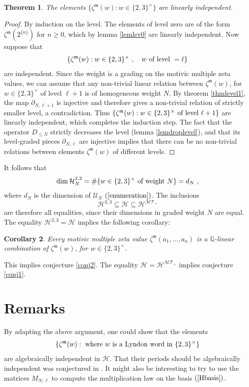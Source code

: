 \documentclass[10pt]{amsart}
\newtheorem{thm}{Theorem}[section]
\newtheorem{cor}[thm]{Corollary}
\theoremstyle{definition}
\theoremstyle{remark}
\numberwithin{equation}{section}
\newcommand{\Ho}{\mathcal{H}}
\newcommand{\Homt}{\mathcal{H^{MT_+}}}
\newcommand{\zetam}{\zeta^{ \mathfrak{m}}}
\newcommand{\Q}{\mathbb Q}
\newcommand{\U}{\mathcal{U}}
\begin{document}
\begin{thm}  The elements
$\{\zetam(w): w\in \{2,3\}^{\times}\}$
are linearly independent.
\end{thm} 
\begin{proof}  By induction on the level. The elements of level zero are of the form 
$\zetam(2^{\{n\}})$ for $n\geq 0$, which by lemma \ref{lemlev0} are linearly independent. Now suppose that 
$$\{\zetam(w): w\in \{2,3\}^\times \ , \quad w \hbox{ of level } = \ell\}$$
are independent. Since the  weight is a grading on the motivic multiple zeta values,  we can assume that any non-trivial linear relation between $\zetam(w)$, for $w\in \{2,3\}^\times$ of level $\ell+1$ is of  homogeneous weight $N$.  By theorem \ref{thmlevel1}, the map $\partial_{N,\ell+1}$ is injective and therefore  gives  a non-trivial  relation  of  strictly smaller  level, a contradiction. Thus $\{\zetam(w): w\in \{2,3\}^\times \hbox{ of level }\ell+1\}$ are linearly independent, which completes the induction step.   The fact that
the operator $D_{\leq N}$  strictly decreases the level 
 (lemma \ref{lemdroplevel}), and that its level-graded pieces    $\partial_{N,\ell}$ are injective   implies  that there can be no non-trivial relations between elements $\zetam(w)$ of different levels.
\end{proof}
It follows that 
\begin{equation} \label{lowerbound} \dim \Ho_N^{2,3}  =  \#\{w\in \{2,3\}^\times  \hbox{ of weight } N\} =  d_N\ ,
\end{equation}
where $d_N$ is the dimension of $\U_N$ $(\ref{enumeration})$. The inclusions
$$\Ho^{2,3}\subseteq \Ho \subseteq \Homt$$
are therefore all equalities, since their dimensions in graded weight $N$ are  equal.
The equality $\Ho^{2,3}=\Ho$ implies the following corollary:
\begin{cor} Every motivic multiple zeta value $\zetam(a_1,\ldots, a_n)$  is a $\Q$-linear combination of $\zetam(w)$,  for $w\in\{2,3\}^\times$.
\end{cor}
 
This  implies conjecture \ref{conj2}. The equality $\Ho=\Homt$ implies  conjecture \ref{conj1}.

\section{Remarks}
By adapting the above argument, one could show that the elements
$$\{\zetam(w): \hbox{ where } w \hbox{ is a Lyndon word in } \{2,3\}^\times\}$$
are algebraically independent in $\Ho$. That their periods should be algebraically independent was conjectured in  \cite{DataMine}.  It might also be interesting to  try to use the matrices $M_{N,\ell}$ to compute the multiplication law on the basis $(\ref{Hbasis})$.
\end{document}

